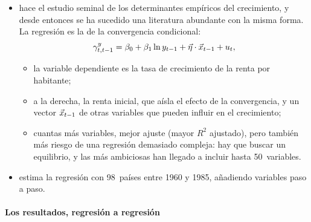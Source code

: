 \documentclass[11pt]{article}
\begin{document}
\begin{itemize}
\item \textcite{Barro1991Economic} hace el estudio seminal de los determinantes empíricos del crecimiento, y desde entonces se ha sucedido una literatura abundante con la misma forma. La regresión es la de la convergencia condicional:
  \[
  \gamma^{y}_{t,t-1}=\beta_0+\beta_1\ln y_{t-1}+\vec{\eta}\cdot\vec{x}_{t-1}+u_t ,
  \]
  \begin{itemize}
  \item la variable dependiente es la tasa de crecimiento de la renta por habitante;
  \item a la derecha, la renta inicial, que aísla el efecto de la convergencia, y un vector $\vec{x}_{t-1}$ de otras variables que pueden influir en el crecimiento;
  \item cuantas más variables, mejor ajuste (mayor $R^2$ ajustado), pero también más riesgo de una regresión demasiado compleja: hay que buscar un equilibrio, y las más ambiciosas han llegado a incluir hasta 50~variables.
  \end{itemize}
\item {} estima la regresión con 98~países entre 1960 y 1985, añadiendo variables paso a paso.
\end{itemize}

\paragraph{Los resultados, regresión a regresión}
\end{document}

